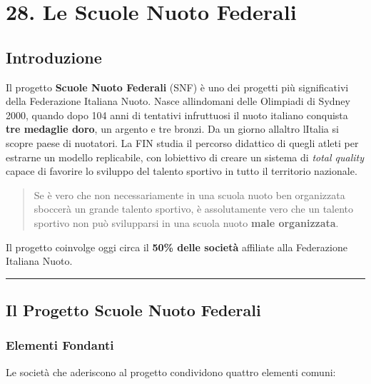 \documentclass[a4paper,11pt]{article}
\begin{document}
\section{28. Le Scuole Nuoto Federali}\label{le-scuole-nuoto-federali}

\subsection{Introduzione}\label{introduzione-27}

Il progetto \textbf{Scuole Nuoto Federali} (SNF) è uno dei progetti più
significativi della Federazione Italiana Nuoto. Nasce
all\textquotesingle indomani delle Olimpiadi di Sydney 2000, quando dopo
104 anni di tentativi infruttuosi il nuoto italiano conquista
\textbf{tre medaglie d\textquotesingle oro}, un argento e tre bronzi. Da
un giorno all\textquotesingle altro l\textquotesingle Italia si scopre
paese di nuotatori. La FIN studia il percorso didattico di quegli atleti
per estrarne un modello replicabile, con l\textquotesingle obiettivo di
creare un sistema di \emph{total quality} capace di favorire lo sviluppo
del talento sportivo in tutto il territorio nazionale.

\begin{quote}
      Se è vero che non necessariamente in una scuola nuoto ben organizzata
      sboccerà un grande talento sportivo, è assolutamente vero che un talento
      sportivo non può svilupparsi in una scuola nuoto \textbf{male
            organizzata}.
\end{quote}

Il progetto coinvolge oggi circa il \textbf{50\% delle società}
affiliate alla Federazione Italiana Nuoto.

\begin{center}\rule{0.5\linewidth}{0.5pt}\end{center}

\subsection{Il Progetto Scuole Nuoto
      Federali}\label{il-progetto-scuole-nuoto-federali}

\subsubsection{Elementi Fondanti}\label{elementi-fondanti}

Le società che aderiscono al progetto condividono quattro elementi
comuni:
\end{document}

